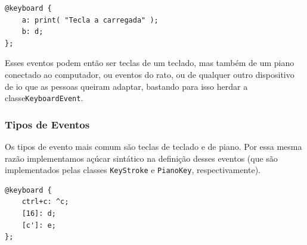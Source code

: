 \begin{lstlisting}[caption={Exemplo de declaração de duas teclas}]
@keyboard {
    a: print( "Tecla a carregada" );
    b: d;
};
\end{lstlisting}

Esses eventos podem então ser teclas de um teclado, mas também de um piano conectado ao computador, ou eventos do rato, ou de qualquer outro dispositivo de \acrshort{io} que as pessoas queiram adaptar, bastando para isso herdar a classe\texttt{KeyboardEvent}.

\subsubsection{Tipos de Eventos}
Os tipos de evento mais comum são teclas de teclado e de piano. Por essa mesma razão implementamos açúcar sintático na definição desses eventos  (que são implementados pelas classes \texttt{KeyStroke} e \texttt{PianoKey}, respectivamente).

\begin{lstlisting}[caption={Declaração de três eventos, o primeiro é uma combinação de teclas, o segundo referência o \textit{virtual key code}, e o terceiro uma nota MIDI}]
@keyboard {
    ctrl+c: ^c;
    [16]: d;
    [c']: e;
};
\end{lstlisting}

